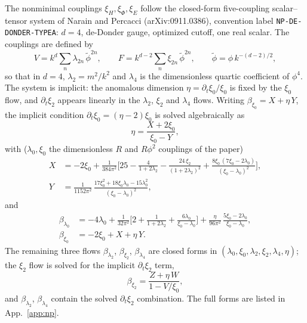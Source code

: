 \documentclass[11pt]{article}
\newcommand{\dt}{\partial_t}
\newcommand{\lfour}{\lambda_4}
\begin{document}
The nonminimal couplings $\xi_H,\xi_\Phi,\xi_E$ follow the closed-form
five-coupling scalar--tensor system of Narain and Percacci
\cite{narain10} (arXiv:0911.0386), convention label \texttt{NP-DE-DONDER-TYPEA}:
$d=4$, de-Donder gauge, optimized cutoff, one real scalar.  The couplings are
defined by
\begin{equation}
  \label{eq:npaction}
  V=k^d\sum_{n}\lambda_{2n}\,\tilde\phi^{2n},\qquad
  F=k^{d-2}\sum_{n}\xi_{2n}\,\tilde\phi^{2n},\qquad
  \tilde\phi=\phi\,k^{-(d-2)/2},
\end{equation}
so that in $d=4$, $\lambda_2=m^2/k^2$ and $\lambda_4$ is the dimensionless
quartic coefficient of $\phi^4$.  The system is implicit: the anomalous
dimension $\eta=\dt\xi_0/\xi_0$ is fixed by the $\xi_0$ flow, and
$\dt\xi_2$ appears linearly in the $\lambda_2$, $\xi_2$ and $\lambda_4$
flows.  Writing $\beta_{\xi_0}=X+\eta\,Y$, the implicit condition
$\dt\xi_0=(\eta-2)\xi_0$ is solved algebraically as
\begin{equation}
  \label{eq:solveeta}
  \eta=\frac{X+2\xi_0}{\xi_0-Y},
\end{equation}
with ($\lambda_0,\xi_0$ the dimensionless $R$ and $R\phi^2$ couplings of the
paper)
\begin{align}
  \label{eq:XY}
  X&=-2\xi_0+\frac{1}{384\pi^2}\Bigg[
    25-\frac{4}{1+2\lambda_2}
    -\frac{24\,\xi_2}{(1+2\lambda_2)^2}
    +\frac{8\xi_0\,(7\xi_0-2\lambda_0)}{(\xi_0-\lambda_0)^2}\Bigg],\\
  Y&=\frac{1}{1152\pi^2}\,
    \frac{17\xi_0^2+18\xi_0\lambda_0-15\lambda_0^2}{(\xi_0-\lambda_0)^2},
\end{align}
and
\begin{align}
  \label{eq:betalam0}
  \beta_{\lambda_0}&=-4\lambda_0+\frac{1}{32\pi^2}
    \Bigg[2+\frac{1}{1+2\lambda_2}+\frac{6\lambda_0}{\xi_0-\lambda_0}\Bigg]
    +\frac{\eta}{96\pi^2}\,\frac{5\xi_0-2\lambda_0}{\xi_0-\lambda_0},\\
  \label{eq:betaxi0}
  \beta_{\xi_0}&=-2\xi_0+X+\eta\,Y .
\end{align}
The remaining three flows $\beta_{\lambda_2}$, $\beta_{\xi_2}$, $\beta_{\lfour}$
are closed forms in $(\lambda_0,\xi_0,\lambda_2,\xi_2,\lfour,\eta)$; the
$\xi_2$ flow is solved for the implicit $\dt\xi_2$ term,
\begin{equation}
  \label{eq:xi2implicit}
  \beta_{\xi_2}=\frac{Z+\eta\,W}{1-V/\xi_0},
\end{equation}
and $\beta_{\lambda_2}$, $\beta_{\lfour}$ contain the solved $\dt\xi_2$
combination.  The full forms are listed in
App.~\ref{app:np}.
\end{document}
